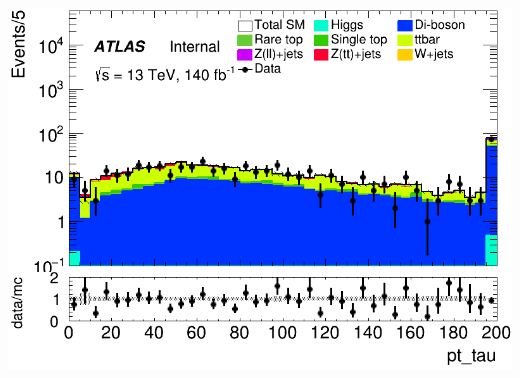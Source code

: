 \documentclass[usenames,dvipsnames]{beamer}
\begin{document}
\begin{frame}
\begin{minipage}{0.32\textwidth}
        \includegraphics[width=\textwidth]{graphics/LLH_met/LLH_met_pt_tau.png}
    \end{minipage}
    
    \vspace{0.5cm} %
\end{frame}
\end{document}
